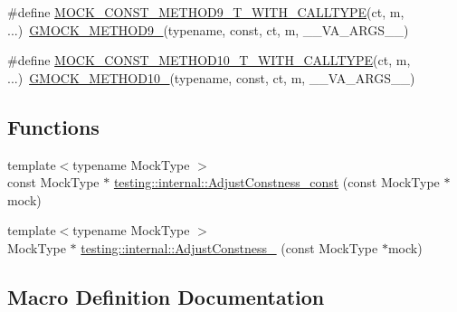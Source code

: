\begin{DoxyCompactItemize}
\item 
\#define \mbox{\hyperlink{_obj__test_2lib_2googletest-release-1_88_81_2googlemock_2include_2gmock_2gmock-generated-function-mockers_8h_afb8878388e0875e109d1fd6902471780}{M\+O\+C\+K\+\_\+\+C\+O\+N\+S\+T\+\_\+\+M\+E\+T\+H\+O\+D9\+\_\+\+T\+\_\+\+W\+I\+T\+H\+\_\+\+C\+A\+L\+L\+T\+Y\+PE}}(ct,  m, ...)~\mbox{\hyperlink{_obj__test_2lib_2googletest-release-1_88_81_2googlemock_2include_2gmock_2gmock-generated-function-mockers_8h_aa820171a19cc587c247dbe05cbffc55f}{G\+M\+O\+C\+K\+\_\+\+M\+E\+T\+H\+O\+D9\+\_\+}}(typename, const, ct, m, \+\_\+\+\_\+\+V\+A\+\_\+\+A\+R\+G\+S\+\_\+\+\_\+)
\item 
\#define \mbox{\hyperlink{_obj__test_2lib_2googletest-release-1_88_81_2googlemock_2include_2gmock_2gmock-generated-function-mockers_8h_af697bae09aedcdfb3d6897081efe7541}{M\+O\+C\+K\+\_\+\+C\+O\+N\+S\+T\+\_\+\+M\+E\+T\+H\+O\+D10\+\_\+\+T\+\_\+\+W\+I\+T\+H\+\_\+\+C\+A\+L\+L\+T\+Y\+PE}}(ct,  m, ...)~\mbox{\hyperlink{_obj__test_2lib_2googletest-release-1_88_81_2googlemock_2include_2gmock_2gmock-generated-function-mockers_8h_a81a48223a8771de36ef92ac6d56f6e81}{G\+M\+O\+C\+K\+\_\+\+M\+E\+T\+H\+O\+D10\+\_\+}}(typename, const, ct, m, \+\_\+\+\_\+\+V\+A\+\_\+\+A\+R\+G\+S\+\_\+\+\_\+)
\end{DoxyCompactItemize}
\subsection*{Functions}
\begin{DoxyCompactItemize}
\item 
{\footnotesize template$<$typename Mock\+Type $>$ }\\const Mock\+Type $\ast$ \mbox{\hyperlink{namespacetesting_1_1internal_a758f640e990a927dc148d6b960c0704b}{testing\+::internal\+::\+Adjust\+Constness\+\_\+const}} (const Mock\+Type $\ast$mock)
\item 
{\footnotesize template$<$typename Mock\+Type $>$ }\\Mock\+Type $\ast$ \mbox{\hyperlink{namespacetesting_1_1internal_a5b32070bcc46f4021c80186e07bc3008}{testing\+::internal\+::\+Adjust\+Constness\+\_\+}} (const Mock\+Type $\ast$mock)
\end{DoxyCompactItemize}


\subsection{Macro Definition Documentation}
\mbox{\label{_obj__test_2lib_2googletest-release-1_88_81_2googlemock_2include_2gmock_2gmock-generated-function-mockers_8h_a887575cc1c31158fba808180a10c004f}} 
